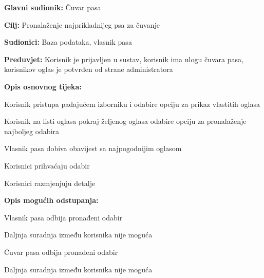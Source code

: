 					\noindent {}
					\begin{packed_item}
						
						\item \textbf{Glavni sudionik: } Čuvar pasa
						\item  \textbf{Cilj:} Pronalaženje najprikladnijeg psa za čuvanje
						\item  \textbf{Sudionici:} Baza podataka, vlasnik pasa
						\item  \textbf{Preduvjet:} Korisnik je prijavljen u sustav, korisnik ima ulogu čuvara pasa, korisnikov oglas je potvrđen od strane administratora
						\item  \textbf{Opis osnovnog tijeka:}
						
						\item[] \begin{packed_enum}
							
							\item Korisnik pristupa padajućem izborniku i odabire opciju za prikaz vlastitih oglasa   
							\item Korisnik na listi oglasa pokraj željenog oglasa odabire opciju za pronalaženje najboljeg odabira  
							\item Vlasnik pasa dobiva obavijest sa najpogodnijim oglasom
							\item Korisnici prihvaćaju odabir
							\item Korisnici razmjenjuju detalje
							
						\end{packed_enum}
						
						\item  \textbf{Opis mogućih odstupanja:}
						
						\item[] \begin{packed_item}
							
							\item[4.a] Vlasnik pasa odbija pronađeni odabir
							\item[] \begin{packed_enum}
								
								\item Daljnja suradnja između korisnika nije moguća
								
							\end{packed_enum}
							\item[4.b] Čuvar pasa odbija pronađeni odabir
							\item[] \begin{packed_enum}
								
								\item Daljnja suradnja između korisnika nije moguća
								
							\end{packed_enum}
						\end{packed_item}
					\end{packed_item}		

